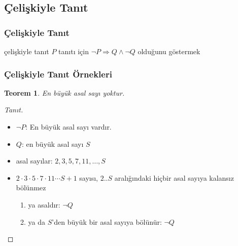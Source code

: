 \documentclass[dvipsnames]{beamer}
\theoremstyle{definition}
\theoremstyle{example}
\theoremstyle{plain}
\newtheorem{teorem}[theorem]{Teorem}
\begin{document}
\subsection{Çelişkiyle Tanıt}

\begin{frame}
  \frametitle{Çelişkiyle Tanıt}

  \begin{block}{çelişkiyle tanıt}
    $P$ tanıtı için $\neg P \Rightarrow Q \wedge \neg Q$ olduğunu göstermek
  \end{block}
\end{frame}

\begin{frame}
  \frametitle{Çelişkiyle Tanıt Örnekleri}

  \begin{teorem}
    En büyük asal sayı yoktur.
  \end{teorem}

  \pause
  \begin{proof}[Tanıt]
    \begin{itemize}
      \item $\neg P$: En büyük asal sayı vardır.

      \pause
      \item $Q$: en büyük asal sayı $S$

      \pause
      \item asal sayılar: $2,3,5,7,11,\dots,S$

      \pause
      \item $2 \cdot 3 \cdot 5 \cdot 7 \cdot 11 \cdots S + 1$ sayısı, $2..S$
        aralığındaki hiçbir asal sayıya kalansız bölünmez

      \pause
      \begin{enumerate}
        \item ya asaldır: $\neg Q$

        \pause
        \item ya da $S$'den büyük bir asal sayıya bölünür: $\neg Q$
      \end{enumerate}
    \end{itemize}
  \end{proof}
\end{frame}
\end{document}
